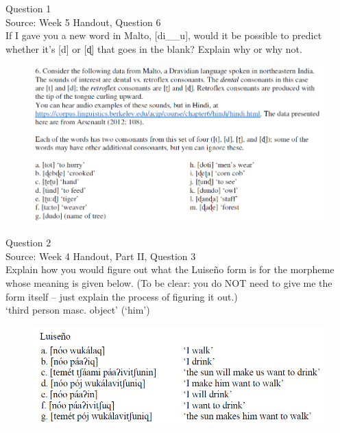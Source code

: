 \documentclass[12pt]{article}
\begin{document}
{\large Question 1}\\

Source: Week 5 Handout, Question 6\\

If I gave you a new word in Malto, [di\_\_u], would it be possible to predict whether it's [d] or [ɖ] that goes in the blank? Explain why or why not.\\

\begin{figure}[H]
\includegraphics{../images/malto.png}
\end{figure}

\newpage

{\large Question 2}\\

Source: Week 4 Handout, Part II, Question 3\\

Explain how you would figure out what the Luiseño form is for the morpheme whose meaning is given below. (To be clear: you do NOT need to give me the form itself -- just explain the process of figuring it out.)\\

‘third person masc. object’ (‘him’)

\begin{figure}[H]
\includegraphics{../images/luiseno.png}
\end{figure}
\end{document}
